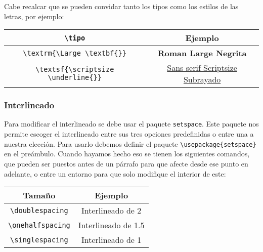 	
	Cabe recalcar que se pueden convidar tanto los tipos como los estilos de las letras, por ejemplo:
	
	\begin{center}
		\begin{tabular}[c]{|c|c|}
			\hline
			\verb|\tipo| & Ejemplo\\
			\hline
			\verb|\textrm{\Large \textbf{}}| & \textrm{{\Large \textbf{Roman Large Negrita}}}\\
			\verb|\textsf{\scriptsize \underline{}}| & \textsf{{\scriptsize \underline{Sans serif Scriptsize Subrayado}}}\\
			\hline	
		\end{tabular}
	\end{center}
	
	
	\subsubsection{Interlineado}
	
	Para modificar el interlineado se debe usar el paquete \texttt{setspace}. Este paquete nos permite escoger el interlineado entre sus tres opciones predefinidas o entre una a nuestra elección. Para usarlo debemos definir el paquete \verb|\usepackage{setspace}| en el preámbulo. Cuando hayamos hecho eso se tienen los siguientes comandos, que pueden ser puestos antes de un párrafo para que afecte desde ese punto en adelante, o entre un entorno para que solo modifique el interior de este:
	
	\begin{center}
		\begin{tabular}{|c|c|}
			\hline
			Tamaño & Ejemplo\\
			\hline
			\verb|\doublespacing| & Interlineado de 2\\
			\hline
			\verb|\onehalfspacing| & Interlineado de 1.5\\
			\hline
			\verb|\singlespacing| & Interlineado de 1\\
			\hline
		\end{tabular}
	\end{center}